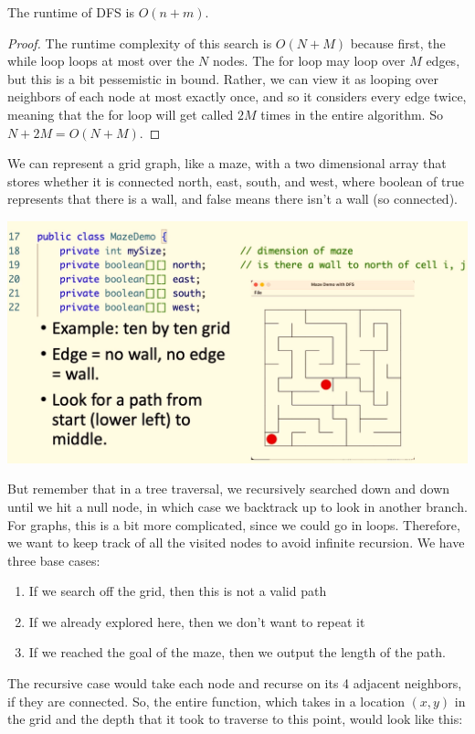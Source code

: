 \documentclass{article}
\begin{document}
    \begin{theorem}
      The runtime of DFS is $O(n+m)$. 
    \end{theorem}
    \begin{proof}
      The runtime complexity of this search is $O(N + M)$ because first, the while loop loops at most over the $N$ nodes. The for loop may loop over $M$ edges, but this is a bit pessemistic in bound. Rather, we can view it as looping over neighbors of each node at most exactly once, and so it considers every edge twice, meaning that the for loop will get called $2M$ times in the entire algorithm. So $N + 2M = O(N + M)$. 
    \end{proof}

    \begin{example}
      We can represent a grid graph, like a maze, with a two dimensional array that stores whether it is connected north, east, south, and west, where boolean of true represents that there is a wall, and false means there isn't a wall (so connected). 
      \begin{center}
        \includegraphics[scale=0.3]{img/grid_graph.png}
      \end{center}
      But remember that in a tree traversal, we recursively searched down and down until we hit a null node, in which case we backtrack up to look in another branch. For graphs, this is a bit more complicated, since we could go in loops. Therefore, we want to keep track of all the visited nodes to avoid infinite recursion. We have three base cases: 
      \begin{enumerate}
          \item If we search off the grid, then this is not a valid path 
          \item If we already explored here, then we don't want to repeat it 
          \item If we reached the goal of the maze, then we output the length of the path. 
      \end{enumerate}
      The recursive case would take each node and recurse on its 4 adjacent neighbors, if they are connected. So, the entire function, which takes in a location $(x, y)$ in the grid and the depth that it took to traverse to this point, would look like this: 
      \begin{lstlisting}


\end{lstlisting}
\end{example}
\end{document}
